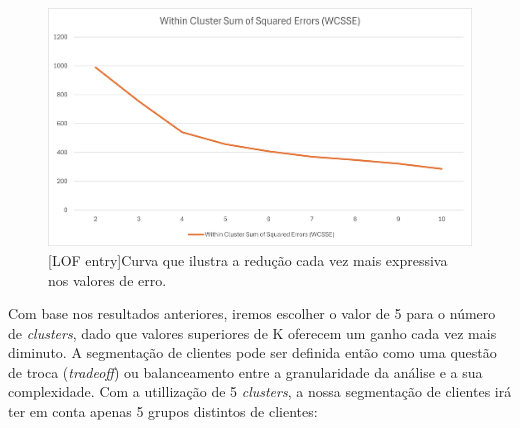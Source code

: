 \documentclass{easychair}
\begin{document}
\begin{figure}[H]
    \begin{centering}
    \includegraphics[width=1\linewidth]{imagens/figure16.jpg}\label{cap-4-fig16}
    [LOF entry]{Curva que ilustra a redução cada vez mais expressiva nos valores de erro.}
    \label{fig16}
    \end{centering}
\end{figure}


Com base nos resultados anteriores, iremos escolher o valor de 5 para o número de \textit{clusters}, dado que valores superiores de K oferecem um ganho cada vez mais diminuto.
A segmentação de clientes pode ser definida então como uma questão de troca (\textit{tradeoff}) ou balanceamento entre a granularidade da análise e a sua complexidade. Com a utillização de 5 \textit{clusters}, a nossa segmentação de clientes irá ter em conta apenas 5 grupos distintos de clientes:
\end{document}
